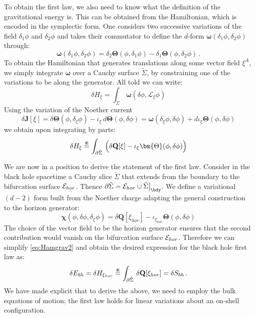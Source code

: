 \documentclass[12pt,openany]{book}
\begin{document}
To obtain the first law, we also need to know what the definition of the gravitational energy is. This can be obtained from the Hamiltonian, which is encoded in the symplectic form. One considers two successive variations of the field $\delta_1 \phi$ and $\delta_2 \phi$ and takes their commutator to define the $d$-form $\bm{\omega}(\delta_1\phi, \delta_2\phi)$ through:
%
\begin{equation}
\bm{\omega}(\delta_1 \phi,\delta_2\phi) = \delta_2 \bm{\Theta}(\phi,\delta_1\phi) - \delta_1 \bm{\Theta}(\phi,\delta_2\phi)\,.
\label{eq:symp}
\end{equation}
%
To obtain the Hamiltonian that generates translations along some vector field $\xi^A$, we simply integrate $\bm{\omega}$ over a Cauchy surface $\tilde{\Sigma}$, by constraining one of the variations to be along the generator.  All told we can write:
%
\begin{equation}
\delta H_\xi = \int_{\tilde{\Sigma}} \, \bm{\omega}(\delta \phi, \mathscr{L}_\xi \phi)
 \label{eq:Hamgrav1}
\end{equation}
%
Using the variation of the Noether current
%
\begin{equation}
\delta \mathbf{J}[\xi]  = \delta{\bm{\Theta}}(\phi,\delta_\xi \phi) - \iota_\xi\, d\bm{\Theta}(\phi, \delta \phi) = \bm{\omega}(\delta_\xi \phi, \delta \phi ) + d\iota_\xi \bm{\Theta}(\phi,\delta \phi)
\label{eq:deltJ}
\end{equation}
%
we obtain upon integrating by parts:
%
\begin{equation}
\delta H_\xi \overset{\textbf{\tiny{E}}}{=} \int_{\partial\tilde{\Sigma}} \, \Big( \delta \mathbf{Q}[\xi] - \iota_\xi \bm{\Theta}(\phi,\delta \phi) \Big)
 \label{eq:Hamgrav2}
\end{equation}
%

We are now in a position to derive the statement of the first law. Consider in the  black hole spacetime a Cauchy slice $\tilde{\Sigma}$ that extends from the boundary to the bifurcation surface ${\cal E}_{hor}$. Thence $\partial \tilde{\Sigma} = {\cal E}_{hor}\cup \tilde{\Sigma}\big|_\bdy $. We define a variational $(d-2)$ form built from the Noether charge adapting the general construction to the horizon generator:
%
\begin{equation}
\bm{\chi}(\phi,\delta \phi, \delta_\xi \phi) = \delta \mathbf{Q}[\xi_{hor}] - \iota_{\xi_{hor}} \bm{\Theta}(\phi,\delta \phi)
\label{}
\end{equation}
%
The choice of the vector field to be the horizon generator ensures that the second contribution would vanish on the bifurcation surface ${\cal E}_{hor}$. Therefore we can simplify \eqref{eq:Hamgrav2} and obtain the desired expression for the black hole first law as:
%
\begin{equation}
\delta E_{bh} = \delta H_{\xi_{hor}} \overset{\textbf{\tiny{E}}}{=} \int_{\partial\tilde{\Sigma}} \, \delta \mathbf{Q}[\xi_{hor}]  = \delta S_{bh}\,.
\label{eq:g1law}
\end{equation}
%
We have made explicit that to derive the above, we need to employ the bulk equations of motion; the first law holds for linear variations about an on-shell configuration.
\end{document}
